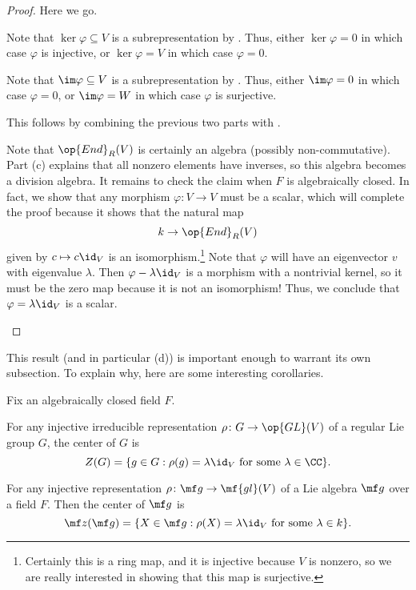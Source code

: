 \documentclass[../notes.tex]{subfiles}
\begin{document}
\begin{proof}
	Here we go.
	\begin{listalph}
		\item Note that $\ker\varphi\subseteq V$ is a subrepresentation by . Thus, either $\ker\varphi=0$ in which case $\varphi$ is injective, or $\ker\varphi=V$ in which case $\varphi=0$.
		\item Note that $\im\varphi\subseteq V$ is a subrepresentation by . Thus, either $\im\varphi=0$ in which case $\varphi=0$, or $\im\varphi=W$ in which case $\varphi$ is surjective.
		\item This follows by combining the previous two parts with .
		\item Note that $\op{End}_R(V)$ is certainly an algebra (possibly non-commutative). Part (c) explains that all non\-zero elements have inverses, so this algebra becomes a division algebra. It remains to check the claim when $F$ is algebraically closed. In fact, we show that any morphism $\varphi\colon V\to V$ must be a scalar, which will complete the proof because it shows that the natural map
		\[k\to\op{End}_R(V)\]
		given by $c\mapsto c\id_V$ is an isomorphism.\footnote{Certainly this is a ring map, and it is injective because $V$ is nonzero, so we are really interested in showing that this map is surjective.} Note that $\varphi$ will have an eigenvector $v$ with eigenvalue $\lambda$. Then $\varphi-\lambda\id_V$ is a morphism with a nontrivial kernel, so it must be the zero map because it is not an isomorphism! Thus, we conclude that $\varphi=\lambda\id_V$ is a scalar.
		\qedhere
	\end{listalph}
\end{proof}
This result (and in particular (d)) is important enough to warrant its own subsection. To explain why, here are some interesting corollaries.
\begin{corollary} \label{cor:center-of-lie}
	Fix an algebraically closed field $F$.
	\begin{listalph}
		\item For any injective irreducible representation $\rho\colon G\to\op{GL}(V)$ of a regular Lie group $G$, the center of $G$ is
		\[Z(G)=\{g\in G:\rho(g)=\lambda{\id_V}\text{ for some }\lambda\in\CC\}.\]
		\item For any injective representation $\rho\colon\mf g\to\mf{gl}(V)$ of a Lie algebra $\mf g$ over a field $F$. Then the center of $\mf g$ is
		\[\mf z(\mf g)=\{X\in\mf g:\rho(X)=\lambda{\id_V}\text{ for some }\lambda\in k\}.\]
	\end{listalph}
\end{corollary}
\end{document}
